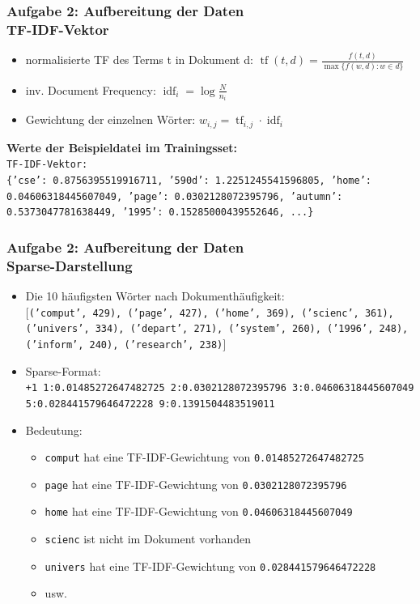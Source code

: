 \documentclass[accentcolor=tud7b,noresetcounter]{tudbeamer}
\begin{document}
	\begin{frame}
		\frametitle{Aufgabe 2: Aufbereitung der Daten\\TF-IDF-Vektor}
		\begin{itemize}
			\item normalisierte TF des Terms t in Dokument d: $\operatorname{tf}(t,d) = \frac{f(t, d)}{\max\{f(w, d):w \in d\}}$
			\item inv. Document Frequency: $\operatorname{idf}_i = \log \frac{N}{n_i}$
			\item Gewichtung der einzelnen Wörter: $w_{i,j} = \operatorname{tf}_{i,j} \cdot \operatorname{idf}_i$
		\end{itemize}
		
		\textbf{Werte der Beispieldatei im Trainingsset:}\\
		\texttt{TF-IDF-Vektor:}\\
		\texttt{\{'cse': 0.8756395519916711, '590d': 1.2251245541596805, 'home': 0.04606318445607049, 'page': 0.0302128072395796, 'autumn': 0.5373047781638449, '1995': 0.15285000439552646, ...\}}
	\end{frame}
	
	\begin{frame}
		\frametitle{Aufgabe 2: Aufbereitung der Daten\\Sparse-Darstellung}
		\begin{itemize}
			\item Die 10 häufigsten Wörter nach Dokumenthäufigkeit:\\
			\texttt{$\lbrack$('comput', 429), ('page', 427), ('home', 369), ('scienc', 361), ('univers', 334), ('depart', 271), ('system', 260), ('1996', 248), ('inform', 240), ('research', 238)$\rbrack$}
			
			\item Sparse-Format:\\
			\texttt{+1 1:0.01485272647482725 2:0.0302128072395796 3:0.04606318445607049 5:0.028441579646472228 9:0.1391504483519011}
			\item Bedeutung:
			\begin{itemize}
 				\item \texttt{comput} hat eine TF-IDF-Gewichtung von \texttt{0.01485272647482725}
 				\item \texttt{page} hat eine TF-IDF-Gewichtung von \texttt{0.0302128072395796}
 				\item \texttt{home} hat eine TF-IDF-Gewichtung von \texttt{0.04606318445607049}
 				\item \texttt{scienc} ist nicht im Dokument vorhanden
 				\item \texttt{univers} hat eine TF-IDF-Gewichtung von \texttt{0.028441579646472228}
 				\item usw.
			\end{itemize}
		\end{itemize}
	\end{frame}
	
\end{document}

